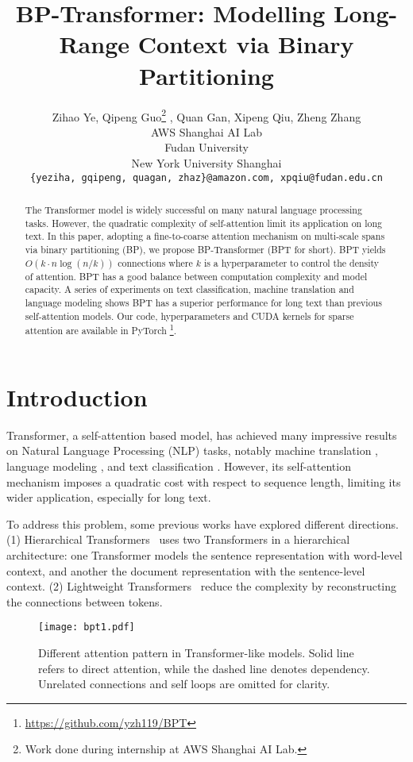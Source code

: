 \documentclass[11pt,a4paper]{article}
\title{BP-Transformer: Modelling Long-Range Context via Binary Partitioning}
\author{Zihao Ye\footnotemark[2] , Qipeng Guo\footnotemark[2] \hspace{0.5mm}\footnotemark[3] \hspace{0.5mm}\thanks{Work done during internship at AWS Shanghai AI Lab.} , Quan Gan\footnotemark[2] ,  Xipeng Qiu\footnotemark[3] \hspace{0.5mm}, Zheng Zhang\footnotemark[2] \hspace{0.5mm}\footnotemark[4] \\
\footnotemark[2]\hspace{0.5mm} AWS Shanghai AI Lab\\
\footnotemark[3]\hspace{0.5mm} Fudan University\\
\footnotemark[4]\hspace{0.5mm} New York University Shanghai \\
\texttt{\{yeziha, gqipeng, quagan, zhaz\}@amazon.com, xpqiu@fudan.edu.cn}
}
\date{}
\begin{document}
\maketitle

\begin{abstract}
The Transformer model is widely successful on many natural language processing tasks. However, the quadratic complexity of self-attention limit its application on long text.
In this paper, adopting a fine-to-coarse attention mechanism on multi-scale spans via binary partitioning (BP), we propose BP-Transformer (BPT for short). BPT yields $O(k\cdot n\log (n/k))$ connections where $k$ is a hyperparameter to control the density of attention. BPT has a good balance between computation complexity and model capacity. A series of experiments on text classification, machine translation and language modeling shows BPT has a superior performance for long text than previous self-attention models.
Our code, hyperparameters and CUDA kernels for sparse attention are available in PyTorch \footnote{\url{https://github.com/yzh119/BPT}}.
\end{abstract}

\section{Introduction}

Transformer, a self-attention based model, has achieved many impressive results on Natural Language Processing (NLP) tasks, notably machine translation \citep{vaswani2017attention}, language modeling \citep{radford2018improving}, and text classification \citep{devlin2018bert}.
However, its self-attention mechanism imposes a quadratic cost with respect to sequence length, limiting its wider application, especially for long text.

To address this problem, some previous works have explored different directions. (1) Hierarchical Transformers~\citep{miculicich-etal-2018-document,liu2019hierarchical} uses two Transformers in a hierarchical architecture: one Transformer models the sentence representation with word-level context, and another the document representation with the sentence-level context. (2) Lightweight Transformers~\citep{child2019sparsetransformer,sukhbaatar2019adaptive,guo2019startransformer,dai2019transformer} reduce the complexity by reconstructing the connections between tokens.



\begin{figure}
\centering
\texttt{[image: bpt1.pdf]}
\caption{Different attention pattern in Transformer-like models. Solid line refers to direct attention, while the dashed line denotes dependency. Unrelated connections and self loops are omitted for clarity.}
\label{fig:bpt1}
\end{figure}
\end{document}
